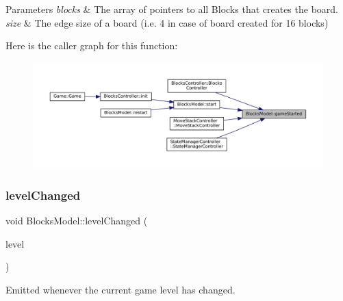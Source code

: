 \begin{DoxyParams}{Parameters}
{\em blocks} & The array of pointers to all Blocks that creates the board. \\
\hline
{\em size} & The edge size of a board (i.\+e. 4 in case of board created for 16 blocks) \\
\hline
\end{DoxyParams}
Here is the caller graph for this function\+:
\nopagebreak
\begin{figure}[H]
\begin{center}
\leavevmode
\includegraphics[width=350pt]{class_blocks_model_ad4beaf1054214a1688033489a0817a8b_icgraph}
\end{center}
\end{figure}
\mbox{\label{class_blocks_model_aadc67f8541695e398bd80f66690308c4}} 
\subsubsection{\texorpdfstring{levelChanged}{levelChanged}}
{\footnotesize\ttfamily void Blocks\+Model\+::level\+Changed (\begin{DoxyParamCaption}\item[{const Game\+Level}]{level }\end{DoxyParamCaption})\hspace{0.3cm}{\ttfamily [signal]}}



Emitted whenever the current game level has changed. 


